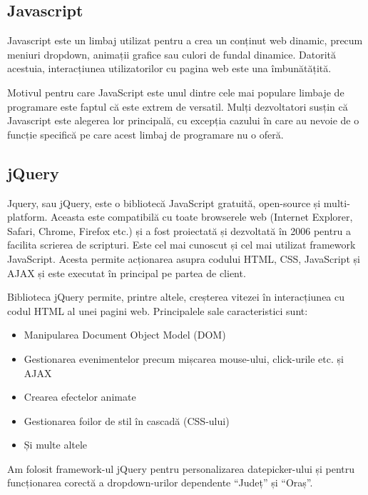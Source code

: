 \documentclass[12pt,a4paper]{report}
\begin{document}
\subsection{Javascript}
\par
Javascript este un limbaj utilizat pentru a crea un conținut web dinamic, precum meniuri dropdown, animații grafice sau culori de fundal dinamice. Datorită acestuia, interacțiunea utilizatorilor cu pagina web este una îmbunătățită. 
\\\par 
Motivul pentru care JavaScript este unul dintre cele mai populare limbaje de programare este faptul că este extrem de versatil. Mulți dezvoltatori susțin că Javascript este alegerea lor principală, cu excepția cazului în care au nevoie de o funcție specifică pe care acest limbaj de programare nu o oferă.

\subsection{jQuery}
\par
Jquery, sau jQuery, este o bibliotecă JavaScript gratuită, open-source și multi-platform. Aceasta este compatibilă cu toate browserele web (Internet Explorer, Safari, Chrome, Firefox etc.) și a fost proiectată și dezvoltată în 2006 pentru a facilita scrierea de scripturi. Este cel mai cunoscut și cel mai utilizat framework JavaScript. Acesta permite acționarea asupra codului HTML, CSS, JavaScript și AJAX și este executat în principal pe partea de client.
\\\par 
Biblioteca jQuery permite, printre altele, creșterea vitezei în interacțiunea cu codul HTML al unei pagini web. Principalele sale caracteristici sunt:
\begin{itemize}
  \item Manipularea Document Object Model (DOM)
  \item Gestionarea evenimentelor precum mișcarea mouse-ului, click-urile etc. și AJAX 
  \item Crearea efectelor animate
  \item Gestionarea foilor de stil în cascadă (CSS-ului)
  \item Și multe altele
\end{itemize}
\par 
Am folosit framework-ul jQuery pentru personalizarea datepicker-ului și pentru funcționarea corectă a dropdown-urilor dependente “Județ” și  “Oraș”.
\end{document}

